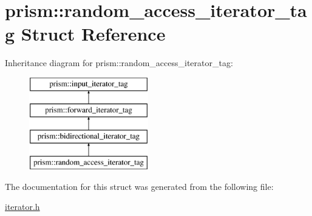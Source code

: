 \hypertarget{structprism_1_1random__access__iterator__tag}{}\section{prism\+:\+:random\+\_\+access\+\_\+iterator\+\_\+tag Struct Reference}
\label{structprism_1_1random__access__iterator__tag}
Inheritance diagram for prism\+:\+:random\+\_\+access\+\_\+iterator\+\_\+tag\+:\begin{figure}[H]
\begin{center}
\leavevmode
\includegraphics[height=4.000000cm]{structprism_1_1random__access__iterator__tag}
\end{center}
\end{figure}


The documentation for this struct was generated from the following file\+:\begin{DoxyCompactItemize}
\item 
\hyperlink{iterator_8h}{iterator.\+h}\end{DoxyCompactItemize}
